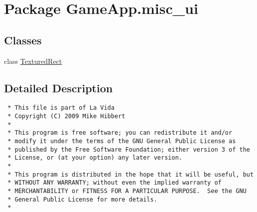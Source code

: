 \hypertarget{namespaceGameApp_1_1misc__ui}{
\section{Package GameApp.misc\_\-ui}
\label{namespaceGameApp_1_1misc__ui}
}


\subsection*{Classes}
\begin{CompactItemize}
\item 
class \hyperlink{classGameApp_1_1misc__ui_1_1TexturedRect}{TexturedRect}
\end{CompactItemize}


\subsection{Detailed Description}


\footnotesize\begin{verbatim}
 * This file is part of La Vida
 * Copyright (C) 2009 Mike Hibbert
 *
 * This program is free software; you can redistribute it and/or
 * modify it under the terms of the GNU General Public License as
 * published by the Free Software Foundation; either version 3 of the
 * License, or (at your option) any later version.
 *
 * This program is distributed in the hope that it will be useful, but
 * WITHOUT ANY WARRANTY; without even the implied warranty of
 * MERCHANTABILITY or FITNESS FOR A PARTICULAR PURPOSE.  See the GNU
 * General Public License for more details.
 *
\end{verbatim}
\normalsize
 